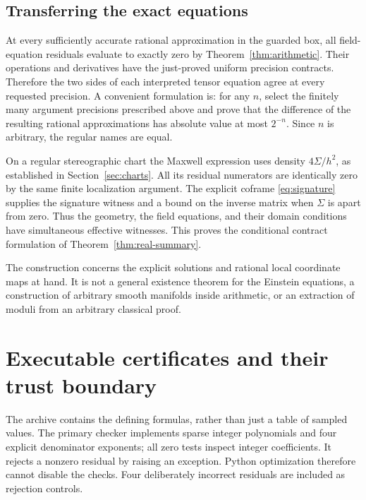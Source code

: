 \documentclass[11pt,a4paper]{article}
\numberwithin{equation}{section}
\theoremstyle{definition}\newtheorem{definition}[theorem]{Definition}
\theoremstyle{remark}\newtheorem{remark}[theorem]{Remark}
\begin{document}
\subsection{Transferring the exact equations}
At every sufficiently accurate rational approximation in the guarded box, all field-equation residuals evaluate to exactly zero by Theorem~\ref{thm:arithmetic}. Their operations and derivatives have the just-proved uniform precision contracts. Therefore the two sides of each interpreted tensor equation agree at every requested precision. A convenient formulation is: for any $n$, select the finitely many argument precisions prescribed above and prove that the difference of the resulting rational approximations has absolute value at most $2^{-n}$. Since $n$ is arbitrary, the regular names are equal.

On a regular stereographic chart the Maxwell expression uses density $4\Sigma/h^2$, as established in Section~\ref{sec:charts}. All its residual numerators are identically zero by the same finite localization argument. The explicit coframe \eqref{eq:signature} supplies the signature witness and a bound on the inverse matrix when $\Sigma$ is apart from zero. Thus the geometry, the field equations, and their domain conditions have simultaneous effective witnesses. This proves the conditional contract formulation of Theorem~\ref{thm:real-summary}.

The construction concerns the explicit solutions and rational local coordinate maps at hand. It is not a general existence theorem for the Einstein equations, a construction of arbitrary smooth manifolds inside arithmetic, or an extraction of moduli from an arbitrary classical proof.

\section{Executable certificates and their trust boundary}\label{sec:verification}

The archive contains the defining formulas, rather than just a table of sampled values. The primary checker implements sparse integer polynomials and four explicit denominator exponents; all zero tests inspect integer coefficients. It rejects a nonzero residual by raising an exception. Python optimization therefore cannot disable the checks. Four deliberately incorrect residuals are included as rejection controls.
\end{document}
